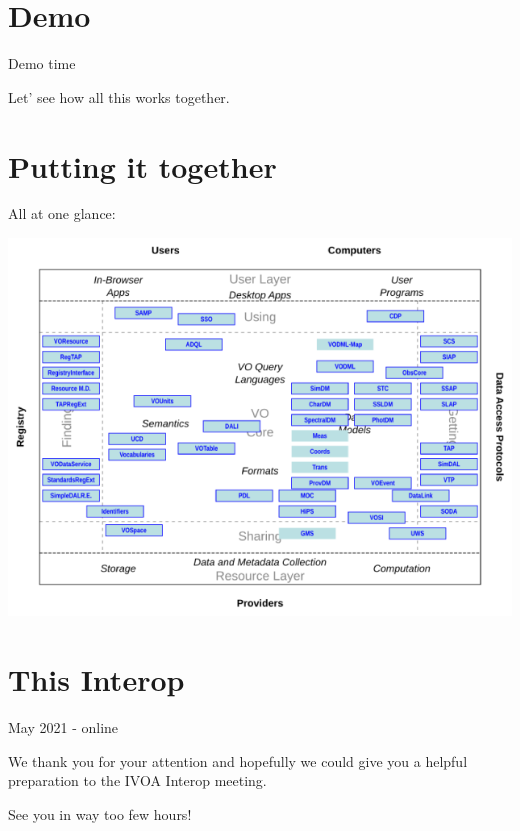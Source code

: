 \documentclass{beamer}
\begin{document}
\section{Demo}

\begin{frame}{Demo time}

Let' see how all this works together.

\end{frame}



\section{Putting it together}

\begin{frame}{All at one glance:}

\includegraphics[width=\linewidth]{archdiag2.png}
\end{frame}


\section{This Interop}

\begin{frame}{May 2021 - online}

We thank you for your attention and hopefully we could give you a
helpful preparation to the IVOA Interop meeting. 

See you in way too few hours! 

\end{frame}
\end{document}
